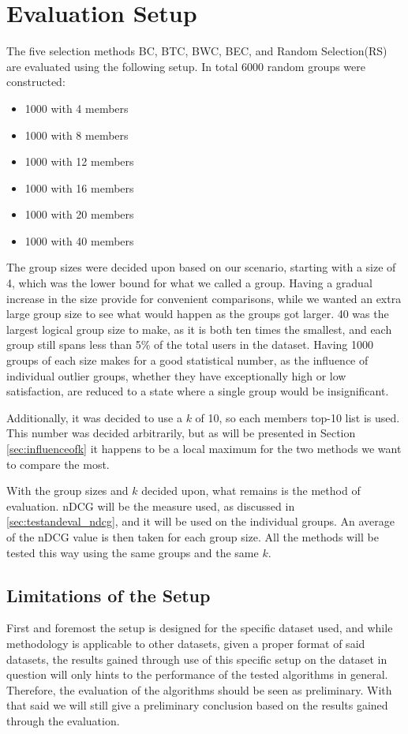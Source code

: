 \section{Evaluation Setup} \label{sec:evaluationsetup}
The five selection methods BC, BTC, BWC, BEC, and Random Selection(RS) are evaluated using the following setup. In total 6000 random groups were constructed:

\begin{itemize}
	\item 1000 with 4 members
	\item 1000 with 8 members
	\item 1000 with 12 members
	\item 1000 with 16 members
	\item 1000 with 20 members
	\item 1000 with 40 members
\end{itemize}

The group sizes were decided upon based on our scenario, starting with a size of 4, which was the lower bound for what we called a group. Having a gradual increase in the size provide for convenient comparisons, while we wanted an extra large group size to see what would happen as the groups got larger. 40 was the largest logical group size to make, as it is both ten times the smallest, and each group still spans less than 5\% of the total users in the dataset.
Having 1000 groups of each size makes for a good statistical number, as the influence of individual outlier groups, whether they have exceptionally high or low satisfaction, are reduced to a state where a single group would be insignificant.

Additionally, it was decided to use a $k$ of 10, so each members top-10 list is used. This number was decided arbitrarily, but as will be presented in Section \ref{sec:influenceofk} it happens to be a local maximum for the two methods we want to compare the most.

With the group sizes and $k$ decided upon, what remains is the method of evaluation. nDCG will be the measure used, as discussed in \ref{sec:testandeval_ndcg}, and it will be used on the individual groups. An average of the nDCG value is then taken for each group size. All the methods will be tested this way using the same groups and the same $k$.

\subsection{Limitations of the Setup} \label{sec:limitsetup}
First and foremost the setup is designed for the specific dataset used, and while methodology is applicable to other datasets, given a proper format of said datasets, the results gained through use of this specific setup on the dataset in question will only hints to the performance of the tested algorithms in general. Therefore, the evaluation of the algorithms should be seen as preliminary. With that said we will still give a preliminary conclusion based on the results gained through the evaluation.

